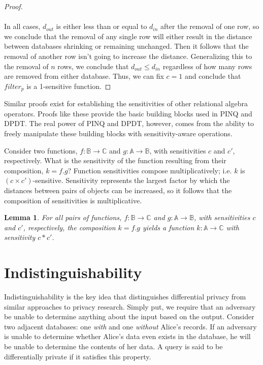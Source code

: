 \documentclass[12pt]{report}
\newtheorem{lem}[defn]{Lemma}
\begin{document}
\begin{proof}
\paragraph{} %
In all cases, $d_{out}$ is either less than or equal to $d_{in}$ after the removal of one row, so we conclude that the removal of any single row will either result in the distance between databases shrinking or remaining unchanged.
Then it follows that the removal of another row isn't going to increase the distance.
Generalizing this to the removal of $n$ rows, we conclude that $d_{out} \le d_{in}$ regardless of how many rows are removed from either database.
Thus, we can fix $c=1$ and conclude that $filter_p$ is a 1-sensitive function.
\end{proof}

Similar proofs exist for establishing the sensitivities of other relational algebra operators.
Proofs like these provide the basic building blocks used in PINQ and DPDT.
The real power of PINQ and DPDT, however, comes from the ability to freely manipulate these building blocks with sensitivity-aware operations.

Consider two functions, $f : \mathbb B \rightarrow \mathbb C$ and $g : \mathbb A \rightarrow \mathbb B$, with sensitivities $c$ and $c'$, respectively.
What is the sensitivity of the function resulting from their composition, $k = f . g$?
Function sensitivities compose multiplicatively; i.e. $k$ is $(c\times c')$-sensitive.
Sensitivity represents the largest factor by which the distances between pairs of objects can be increased, so it follows that the composition of sensitivities is multiplicative.

\begin{lem}
  For all pairs of functions, $f : \mathbb B \rightarrow \mathbb C$ and $g : \mathbb A \rightarrow \mathbb B$, with sensitivities $c$ and $c'$, respectively, the composition $k = f . g$ yields a function $k : \mathbb A \rightarrow \mathbb C$ with sensitivity $c*c'$.
\end{lem}

\section{Indistinguishability}

Indistinguishability is the key idea that distinguishes differential privacy from similar approaches to privacy research.
Simply put, we require that an adversary be unable to determine anything about the input based on the output.
Consider two adjacent databases: one \textit{with} and one \textit{without} Alice's records.
If an adversary is unable to determine whether Alice's data even exists in the database, he will be unable to determine the contents of her data.
A query is said to be differentially private if it satisfies this property.
\end{document}
